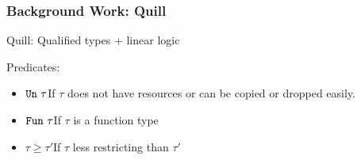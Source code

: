 


\begin{frame}
  \frametitle{Background Work: Quill}
  \begin{center}
    Quill\citep{morris_best_2016}: {\color{blue}Qu}al{\color{blue}i}fied types + {\color{blue}l}inear {\color{blue}l}ogic\\
  \end{center}
  Predicates:
  \begin{itemize}
  \item $\texttt{Un}\ \tau$\quad If $\tau$ does not have resources
    or can be copied or dropped easily.
  \item $\texttt{Fun}\ \tau$\quad If $\tau$ is a function type
  \item $\tau \geq \tau'$\quad If $\tau$ less restricting than $\tau'$
  \end{itemize}
\end{frame}


